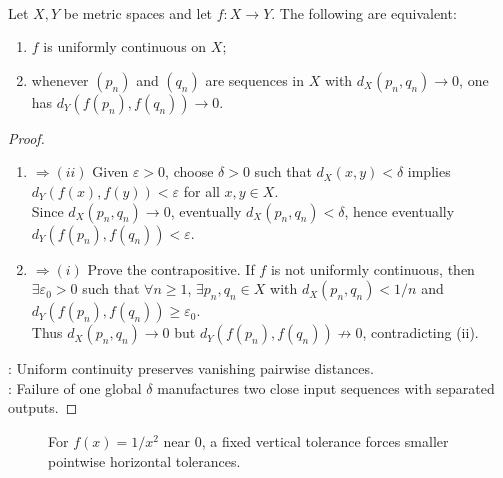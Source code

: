 \begin{proposition} \label{prop:uniform-continuity-sequential-test} \\
Let $X,Y$ be metric spaces and let $f:X\to Y$. The following are equivalent:
\begin{enumerate}[label=(\roman*)]
\setlength{\itemsep}{0pt}
\item $f$ is uniformly continuous on $X$;
\item whenever $(p_n)$ and $(q_n)$ are sequences in $X$ with $d_X(p_n,q_n)\to0$, one has $d_Y(f(p_n),f(q_n))\to0$.
\end{enumerate}
\begin{proof}
\begin{enumerate}[label=(\roman*).]
\setlength{\itemsep}{0pt}
\item[$(i)$]$\Rightarrow (ii)$ Given $\varepsilon>0$, choose $\delta>0$ such that $d_X(x,y)<\delta$ implies $d_Y(f(x),f(y))<\varepsilon$ for all $x,y\in X$.\\
Since $d_X(p_n,q_n)\to0$, eventually $d_X(p_n,q_n)<\delta$, hence eventually $d_Y(f(p_n),f(q_n))<\varepsilon$.
\item[$(ii)$]$\Rightarrow (i)$ Prove the contrapositive. If $f$ is not uniformly continuous, then $\exists \varepsilon_0>0$ such that $\forall n\geq1$, $\exists p_n,q_n\in X$ with $d_X(p_n,q_n)<1/n$ and $d_Y(f(p_n),f(q_n))\geq\varepsilon_0$.\\
Thus $d_X(p_n,q_n)\to0$ but $d_Y(f(p_n),f(q_n))\not\to0$, contradicting (ii).
\end{enumerate}
: Uniform continuity preserves vanishing pairwise distances.\\
: Failure of one global $\delta$ manufactures two close input sequences with separated outputs.
\end{proof}
\end{proposition}

\begin{figure}[H]
  \centering
  
  \caption{For $f(x)=1/x^2$ near $0$, a fixed vertical tolerance forces smaller pointwise horizontal tolerances.}
  \label{fig:uniform-continuity-delta-shrinks-one-over-x-squared}
\end{figure}

